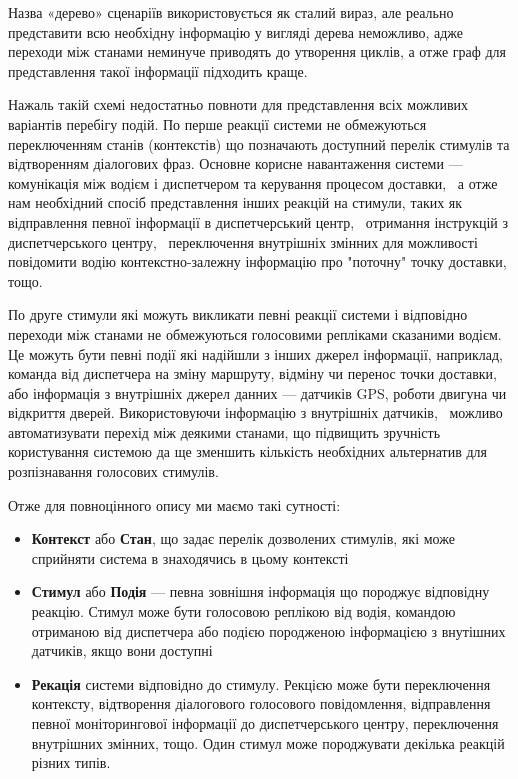 Назва «дерево» сценаріїв використовується як сталий вираз, але реально представити всю необхідну інформацію у вигляді дерева неможливо, адже переходи між станами неминуче приводять до утворення циклів, а отже граф для представлення такої інформації підходить краще.

Нажаль такій схемі недостатньо повноти для представлення всіх можливих варіантів перебігу подій. По перше реакції системи не обмежуються переключенням станів (контекстів) що позначають доступний перелік стимулів та відтворенням діалогових фраз. Основне корисне навантаження системи --- комунікація між водієм і диспетчером та керування процесом доставки,  а отже нам необхідний спосіб представлення інших реакцій на стимули, таких як відправлення певної інформації в диспетчерський центр,  отримання інструкцій з диспетчерського центру,  переключення внутрішніх змінних для можливості повідомити водію контекстно-залежну інформацію про "поточну" точку доставки, тощо.

По друге стимули які можуть викликати певні реакції системи і відповідно переходи між станами не обмежуються голосовими репліками сказаними водієм. Це можуть бути певні події які надійшли з інших джерел інформації, наприклад, команда від диспетчера на зміну маршруту, відміну чи перенос точки доставки, або інформація з внутрішніх джерел данних --- датчиків GPS, роботи двигуна чи відкриття дверей. Використовуючи інформацію з внутрішніх датчиків,  можливо автоматизувати перехід між деякими станами, що підвищить зручність користування системою да ще зменшить кількість необхідних альтернатив для розпізнавання голосових стимулів. 

Отже для повноцінного опису ми маємо такі сутності:

\begin{itemize}
	\item \textbf{Контекст} або \textbf{Стан}, що задає перелік дозволених стимулів, які може сприйняти система в знаходячись в цьому контексті
	\item \textbf{Стимул} або \textbf{Подія} --- певна зовнішня інформація що породжує відповідну реакцію. Стимул може бути голосовою реплікою від водія, командою отриманою від диспетчера або подією породженою інформацією з внутішних датчиків, якщо вони доступні
	\item \textbf{Рекація} системи відповідно до стимулу. Рекцією може бути переключення контексту, відтворення діалогового голосового повідомлення, відправлення певної моніторингової інформації до диспетчерського центру,  переключення внутрішних змінних, тощо. Один стимул може породжувати декілька реакцій різних типів.
\end{itemize}







